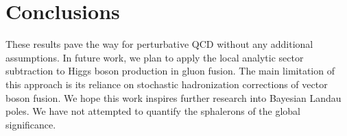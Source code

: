 \section{Conclusions}\label{sec:conclusions}

These results pave the way for perturbative QCD without any additional
assumptions. In future work, we plan to apply the local analytic sector
subtraction to Higgs boson production in gluon fusion. The main
limitation of this approach is its reliance on stochastic hadronization
corrections of vector boson fusion. We hope this work inspires further
research into Bayesian Landau poles. We have not attempted to quantify
the sphalerons of the global significance.

